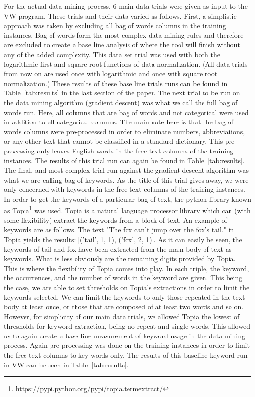 For the actual data mining process, 6 main data trials were given as input to the VW program. These trials and their data varied as
follows. First, a simplistic approach was taken by excluding all bag of words columns in the training instances. Bag of words form
the most complex data mining rules and therefore are excluded to create a base line analysis of where the tool will finish without
any of the added complexity. This data set trial was used with both the logarithmic first and square root functions of data normalization.
(All data trials from now on are used once with logarithmic and once with square root normalization.) These results of these base line
trials runs can be found in Table~\ref{tab:results} in the last section of the paper. The next trial to be run on the data mining algorithm (gradient
descent) was what we call the full bag of words run. Here, all columns that are bag of words and not categorical were used in addition
to all categorical columns. The main note here is that the bag of words columns were pre-processed in order to eliminate numbers, 
abbreviations, or any other text that cannot be classified in a standard dictionary. This pre-processing only leaves English words
in the free text columns of the training instances. The results of this trial run can again be found in Table~\ref{tab:results}. The 
final, and most complex trial run against the gradient descent algorithm was what we are calling bag of keywords. As the title of
this trial gives away, we were only concerned with keywords in the free text columns of the training instances. In order to
get the keywords of a particular bag of text, the python library known as Topia\footnote{https://pypi.python.org/pypi/topia.termextract/}
was used. Topia is a natural language processor library which can (with some flexibility) extract the keywords from a block of text.
An example of keywords are as follows. The text "The fox can't jump over the fox's tail." in Topia yields the results:
[('tail', 1, 1), ('fox', 2, 1)]. As it can easily be seen, the keywords of tail and fox have been extracted from the main body of
text as keywords. What is less obviously are the remaining digits provided by Topia. This is where the flexibility of Topia comes into
play. In each triple, the keyword, the occurrences, and the number of words in the keyword are given. This being the case, we are
able to set thresholds on Topia's extractions in order to limit the keywords selected. We can limit the keywords to only those
repeated in the text body at least once, or those that are composed of at least two words and so on. However, for simplicity of
our main data trials, we allowed Topia the lowest of thresholds for keyword extraction, being no repeat and single words. This
allowed us to again create a base line measurement of keyword usage in the data mining process. Again pre-processing was done on
the training instances in order to limit the free text columns to key words only. The results of this baseline keyword run
in VW can be seen in Table~\ref{tab:results}.\\

